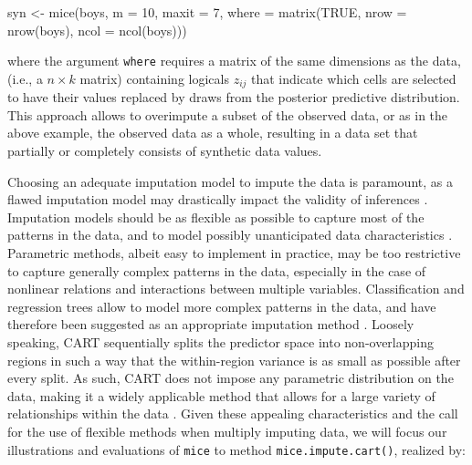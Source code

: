 \documentclass[psych,article,submit,moreauthors,pdftex]{mdpi}
\newenvironment{Shaded}{\begin{snugshade}}{\end{snugshade}}
\newcommand{\AttributeTok}[1]{\textcolor[rgb]{0.77,0.63,0.00}{#1}}
\newcommand{\ConstantTok}[1]{\textcolor[rgb]{0.00,0.00,0.00}{#1}}
\newcommand{\DecValTok}[1]{\textcolor[rgb]{0.00,0.00,0.81}{#1}}
\newcommand{\FunctionTok}[1]{\textcolor[rgb]{0.00,0.00,0.00}{#1}}
\newcommand{\NormalTok}[1]{#1}
\newcommand{\OtherTok}[1]{\textcolor[rgb]{0.56,0.35,0.01}{#1}}
\begin{document}
\begin{Shaded}
\begin{Highlighting}[]
\NormalTok{syn }\OtherTok{\textless{}{-}} \FunctionTok{mice}\NormalTok{(boys, }
            \AttributeTok{m =} \DecValTok{10}\NormalTok{,}
            \AttributeTok{maxit =} \DecValTok{7}\NormalTok{, }
            \AttributeTok{where =} \FunctionTok{matrix}\NormalTok{(}\ConstantTok{TRUE}\NormalTok{, }
                           \AttributeTok{nrow =} \FunctionTok{nrow}\NormalTok{(boys),}
                           \AttributeTok{ncol =} \FunctionTok{ncol}\NormalTok{(boys)))}
\end{Highlighting}
\end{Shaded}

where the argument \texttt{where} requires a matrix of the same
dimensions as the data, (i.e., a \(n \times k\) matrix) containing
logicals \(z_{ij}\) that indicate which cells are selected to have their
values replaced by draws from the posterior predictive distribution.
This approach allows to overimpute a subset of the observed data, or as
in the above example, the observed data as a whole, resulting in a data
set that partially or completely consists of synthetic data values.

Choosing an adequate imputation model to impute the data is paramount,
as a flawed imputation model may drastically impact the validity of
inferences \citep{grund2021using, jiang2021balancing}. Imputation models
should be as flexible as possible to capture most of the patterns in the
data, and to model possibly unanticipated data characteristics
\citep{murray_multiple_2018, rubin_18years_1996}. Parametric methods,
albeit easy to implement in practice, may be too restrictive to capture
generally complex patterns in the data, especially in the case of
nonlinear relations and interactions between multiple variables.
Classification and regression trees \citep[CART;][]{breiman_cart_1984}
allow to model more complex patterns in the data, and have therefore
been suggested as an appropriate imputation method
\citep{reiter_cart_2005, burgette_reiter_cart_2010, doove_buuren_recursive_2014}.
Loosely speaking, CART sequentially splits the predictor space into
non-overlapping regions in such a way that the within-region variance is
as small as possible after every split. As such, CART does not impose
any parametric distribution on the data, making it a widely applicable
method that allows for a large variety of relationships within the data
\citep{islr_2013}. Given these appealing characteristics and the call
for the use of flexible methods when multiply imputing data, we will
focus our illustrations and evaluations of \texttt{mice} to method
\texttt{mice.impute.cart()}, realized by:
\end{document}
